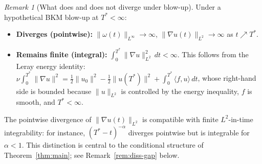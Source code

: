 \documentclass[12pt,a4paper]{article}
\theoremstyle{definition}
\theoremstyle{plain}
\theoremstyle{remark}
\newtheorem{remark}[definition]{Remark}
\begin{document}
\begin{remark}[What does and does not diverge under blow-up]
\label{rem:divergence-landscape}
Under a hypothetical BKM blow-up at $T^* < \infty$:
\begin{itemize}
  \item \textbf{Diverges (pointwise):}\;
    $\|\omega(t)\|_{L^\infty} \to \infty$,\;
    $\|\nabla u(t)\|_{L^2} \to \infty$ as $t \nearrow T^*$.
  \item \textbf{Remains finite (integral):}\;
    $\int_0^{T^*}\|\nabla u\|_{L^2}^2\,dt < \infty$.
    This follows from the Leray energy identity:
    $\nu\int_0^{T^*}\|\nabla u\|^2
    = \tfrac{1}{2}\|u_0\|^2 - \tfrac{1}{2}\|u(T^*)\|^2
    + \int_0^{T^*}\langle f,u\rangle\,dt$,
    whose right-hand side is bounded because $\|u\|_{L^2}$ is
    controlled by the energy inequality, $f$ is smooth, and $T^* < \infty$.
\end{itemize}
The pointwise divergence of $\|\nabla u(t)\|_{L^2}$ is compatible with
finite $L^2$-in-time integrability: for instance,
$(T^*-t)^{-\alpha}$ diverges pointwise but is integrable for $\alpha < 1$.
This distinction is central to the conditional structure of
Theorem~\ref{thm:main}; see Remark~\ref{rem:diss-gap} below.
\end{remark}
\end{document}

